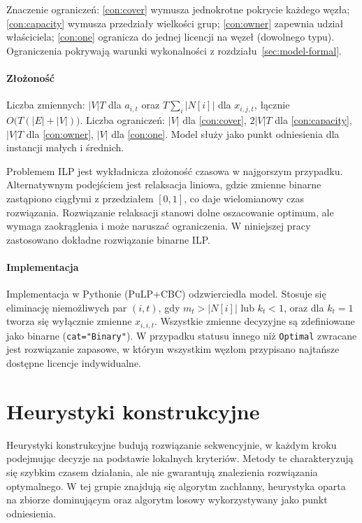 Znaczenie ograniczeń: \eqref{con:cover} wymusza jednokrotne pokrycie każdego węzła; \eqref{con:capacity} wymusza przedziały wielkości grup; \eqref{con:owner} zapewnia udział właściciela; \eqref{con:one} ogranicza do jednej licencji na węzeł (dowolnego typu). Ograniczenia pokrywają warunki wykonalności z rozdziału~\ref{sec:model-formal}.

\paragraph{Złożoność}
Liczba zmiennych: \(|V|T\) dla \(a_{i,t}\) oraz \(T\sum_i |N[i]|\) dla \(x_{i,j,t}\), łącznie \(O\!\bigl(T(|E|+|V|)\bigr)\).
Liczba ograniczeń: \(|V|\) dla \eqref{con:cover}, \(2|V|T\) dla \eqref{con:capacity}, \(|V|T\) dla \eqref{con:owner}, \(|V|\) dla \eqref{con:one}.
Model służy jako punkt odniesienia dla instancji małych i średnich.

Problemem ILP jest wykładnicza złożoność czasowa w najgorszym przypadku. Alternatywnym podejściem jest relaksacja liniowa, gdzie zmienne binarne zastąpiono ciągłymi z przedziałem \([0,1]\), co daje wielomianowy czas rozwiązania. Rozwiązanie relaksacji stanowi dolne oszacowanie optimum, ale wymaga zaokrąglenia i może naruszać ograniczenia. W niniejszej pracy zastosowano dokładne rozwiązanie binarne ILP.

\paragraph{Implementacja}
Implementacja w Pythonie (PuLP+CBC) odzwierciedla model. Stosuje się eliminację niemożliwych par \((i,t)\), gdy \(m_t>|N[i]|\) lub \(k_t<1\), oraz dla \(k_t=1\) tworza się wyłącznie zmienne \(x_{i,i,t}\).
Wszystkie zmienne decyzyjne są zdefiniowane jako binarne (\texttt{cat="Binary"}).
W przypadku statusu innego niż \texttt{Optimal} zwracane jest rozwiązanie zapasowe, w którym wszystkim węzłom przypisano najtańsze dostępne licencje indywidualne.

\section{Heurystyki konstrukcyjne}

Heurystyki konstrukcyjne budują rozwiązanie sekwencyjnie, w każdym kroku podejmując decyzje na podstawie lokalnych kryteriów. Metody te charakteryzują się szybkim czasem działania, ale nie gwarantują znalezienia rozwiązania optymalnego. W tej grupie znajdują się algorytm zachłanny, heurystyka oparta na zbiorze dominującym oraz algorytm losowy wykorzystywany jako punkt odniesienia.

